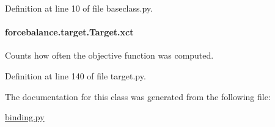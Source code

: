 Definition at line 10 of file baseclass.\-py.

\hypertarget{classforcebalance_1_1target_1_1Target_aad2e385cfbf7b4a68f1c2cb41133fe82}{
\paragraph[{xct}]{\setlength{\rightskip}{0pt plus 5cm}forcebalance.\-target.\-Target.\-xct\hspace{0.3cm}{\ttfamily [inherited]}}}\label{classforcebalance_1_1target_1_1Target_aad2e385cfbf7b4a68f1c2cb41133fe82}


Counts how often the objective function was computed. 



Definition at line 140 of file target.\-py.



The documentation for this class was generated from the following file\-:\begin{DoxyCompactItemize}
\item 
\hyperlink{binding_8py}{binding.\-py}\end{DoxyCompactItemize}
